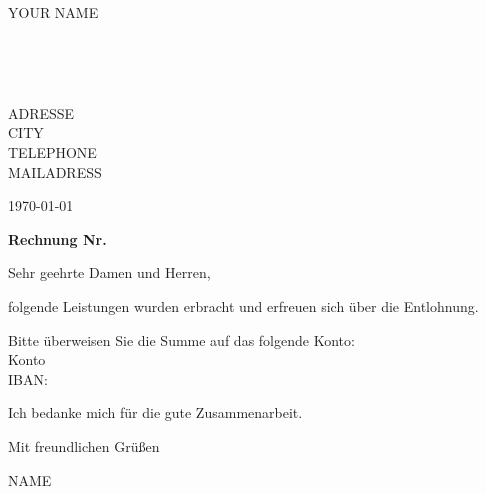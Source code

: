 \documentclass[fontsize=11pt, a4paper]{scrartcl}
\begin{document}
	\sffamily
	\flushleft
	\pagestyle{empty}
	\begin{flushright}
		\begin{large}YOUR NAME\end{large}\\
		\begin{tiny}\hrulefill \\\end{tiny} 
		ADRESSE \\
		CITY\\
		TELEPHONE\\
		MAILADRESS\\
	\end{flushright}
	\vspace{1cm}
	
	
	
	\begin{flushright}
		\today \vspace{0.5cm}
	\end{flushright}
	
	\textbf{Rechnung Nr. }\bigskip\bigskip
	
	Sehr geehrte Damen und Herren,\bigskip
	
	folgende Leistungen wurden erbracht und erfreuen sich über die Entlohnung.
	
	
	
	\begin{flushright}
		{\footnotesize }
	\end{flushright}
	\bigskip
	
	Bitte überweisen Sie die Summe auf das folgende Konto:\\
	Konto \\
	IBAN: \bigskip
	
	Ich bedanke mich für die gute Zusammenarbeit. \bigskip
	
	Mit freundlichen Grüßen\bigskip\bigskip
	
	
	NAME\medskip
	
	
	
\end{document}
